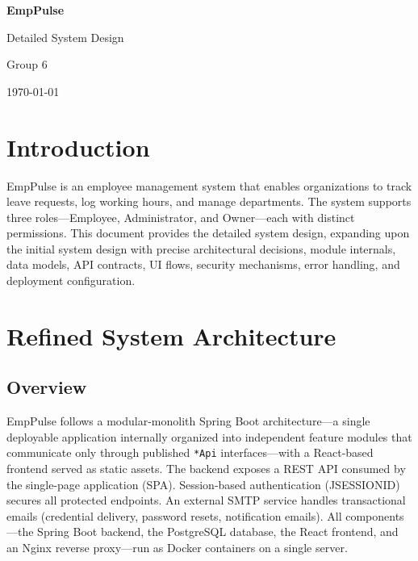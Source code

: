 \documentclass[11pt,a4paper]{article}
\begin{document}
\begin{titlepage}
\centering
\vspace*{3cm}
{\Huge\bfseries EmpPulse\par}
\vspace{0.5cm}
{\LARGE Detailed System Design\par}
\vspace{2cm}
{\Large Group 6\par}
\vspace{1cm}
{\large\today\par}
\vfill
\end{titlepage}

\tableofcontents
\newpage

\section{Introduction}

EmpPulse is an employee management system that enables organizations to track leave requests, log working hours, and manage departments. The system supports three roles---Employee, Administrator, and Owner---each with distinct permissions. This document provides the detailed system design, expanding upon the initial system design with precise architectural decisions, module internals, data models, API contracts, UI flows, security mechanisms, error handling, and deployment configuration.

\section{Refined System Architecture}
\label{sec:architecture}

\subsection{Overview}

EmpPulse follows a modular-monolith Spring Boot architecture---a single deployable application internally organized into independent feature modules that communicate only through published \texttt{*Api} interfaces---with a React-based frontend served as static assets. The backend exposes a REST API consumed by the single-page application (SPA). Session-based authentication (JSESSIONID) secures all protected endpoints. An external SMTP service handles transactional emails (credential delivery, password resets, notification emails). All components---the Spring Boot backend, the PostgreSQL database, the React frontend, and an Nginx reverse proxy---run as Docker containers on a single server.
\end{document}
